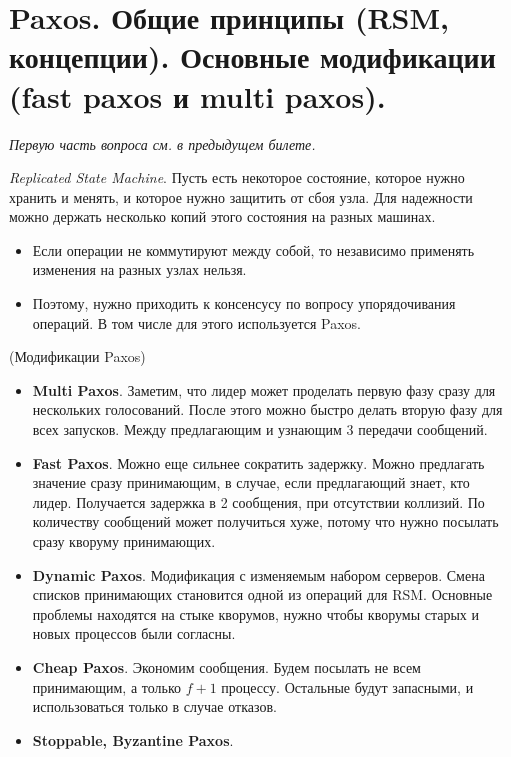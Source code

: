 \section{Paxos. Общие принципы (RSM, концепции). Основные модификации 
(fast paxos и multi paxos).}

\textit{Первую часть вопроса см. в предыдущем билете.}

\begin{definition}
    \textit{Replicated State Machine}. Пусть есть некоторое состояние, которое нужно
    хранить и менять, и которое нужно защитить от сбоя узла. Для надежности можно
    держать несколько копий этого состояния на разных машинах.
    \begin{itemize}
        \item Если операции не коммутируют между собой, то независимо применять
            изменения на разных узлах нельзя.
        \item Поэтому, нужно приходить к консенсусу по вопросу упорядочивания
            операций. В том числе для этого используется Paxos.
    \end{itemize}
\end{definition}

\begin{remark}(Модификации Paxos)
    
    \begin{itemize}
        \item \textbf{Multi Paxos}. Заметим, что лидер может проделать первую фазу
            сразу для нескольких голосований. После этого можно быстро делать
            вторую фазу для всех запусков. Между предлагающим и узнающим
            3 передачи сообщений.
        \item \textbf{Fast Paxos}. Можно еще сильнее сократить задержку.
            Можно предлагать значение сразу принимающим, в случае, если
            предлагающий знает, кто лидер. Получается задержка в 2 сообщения, 
            при отсутствии коллизий. По количеству сообщений может получиться
            хуже, потому что нужно посылать сразу кворуму принимающих.
        \item \textbf{Dynamic Paxos}. Модификация с изменяемым набором серверов.
            Смена списков принимающих становится одной из операций для RSM.
            Основные проблемы находятся на стыке кворумов, нужно чтобы кворумы
            старых и новых процессов были согласны.
        \item \textbf{Cheap Paxos}. Экономим сообщения. Будем посылать не всем
            принимающим, а только $f + 1$ процессу. Остальные будут запасными,
            и использоваться только в случае отказов.
        \item \textbf{Stoppable, Byzantine Paxos}.
    \end{itemize}
\end{remark}
